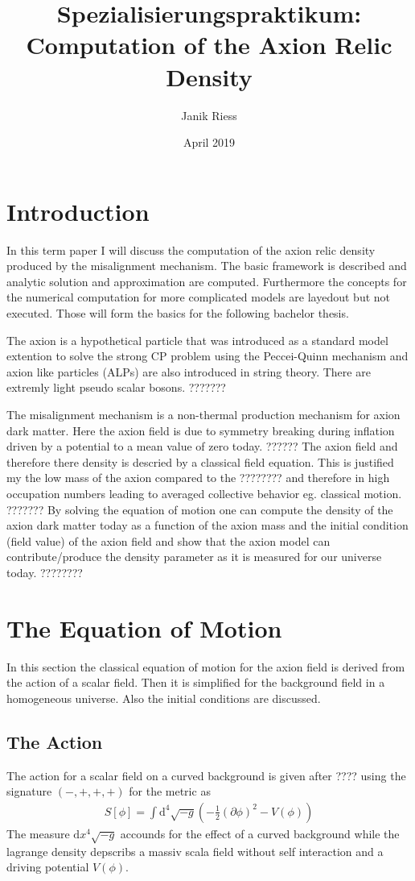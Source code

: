 \documentclass[a4paper]{article}
\title{Spezialisierungspraktikum: \\ Computation of the Axion Relic Density}
\author{Janik Riess }
\date{April 2019}
\begin{document}
\maketitle

\section{Introduction}
In this term paper I will discuss the
computation of the axion relic density produced by the misalignment mechanism. The basic framework is
described and analytic solution and approximation are computed.
Furthermore the concepts for the numerical computation for more complicated models are layedout but not executed. Those will form the basics for the following bachelor thesis.

The axion is a hypothetical particle that was introduced as a standard model
extention to solve the strong CP problem using the Peccei-Quinn mechanism and axion like particles (ALPs) are also
introduced in string theory. There are extremly light pseudo scalar bosons. ???????

The misalignment mechanism is a non-thermal production mechanism for axion dark matter.
Here the axion field is due to symmetry breaking during inflation driven by a potential
to a mean value of zero today. ??????
The axion field and therefore there density is descried by a classical field equation.
This is justified my the low mass of the axion compared to the ????????
and therefore in high occupation numbers leading to averaged collective behavior
eg. classical motion. ???????
By solving the equation of motion one can compute the density of the axion dark matter
today as a function of the axion mass and the initial condition (field value)
of the axion field and show that the axion model can contribute/produce the density parameter as it is measured for our universe today. ????????

\section{The Equation of Motion}
In this section the classical equation of motion for the axion field is derived from the action of a scalar field. Then it is simplified for the background field in a homogeneous universe. Also the initial conditions are discussed.

\subsection{The Action}
The action for a scalar field on a curved background is given after ????
using the signature $(-, +, +, +)$ for the metric as
\begin{align}
    \label{eq:action}
    S[\phi] = \int \mathrm{d}^4 \sqrt{-g} \left(- \frac{1}{2} (\partial \phi)^2 - V(\phi) \right)
\end{align}
The measure $\mathrm{d}x^4 \sqrt{-g}$ accounds for the effect of a curved background while
the lagrange density depscribs a massiv scala field without self interaction
and a driving potential $V(\phi)$.
\end{document}
